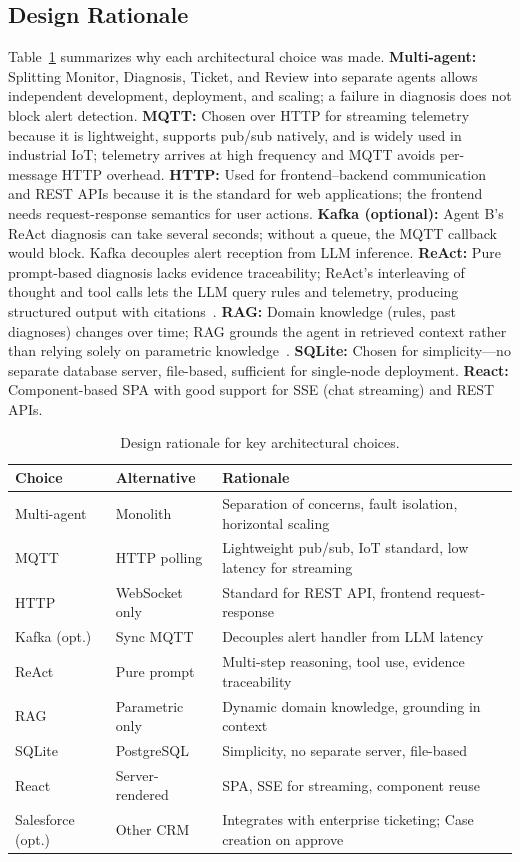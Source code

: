 \documentclass[12pt,letterpaper]{report}
\begin{document}
\subsection{Design Rationale}

Table~\ref{tab:rationale} summarizes why each architectural choice was made. \textbf{Multi-agent:} Splitting Monitor, Diagnosis, Ticket, and Review into separate agents allows independent development, deployment, and scaling; a failure in diagnosis does not block alert detection. \textbf{MQTT:} Chosen over HTTP for streaming telemetry because it is lightweight, supports pub/sub natively, and is widely used in industrial IoT; telemetry arrives at high frequency and MQTT avoids per-message HTTP overhead. \textbf{HTTP:} Used for frontend--backend communication and REST APIs because it is the standard for web applications; the frontend needs request-response semantics for user actions. \textbf{Kafka (optional):} Agent B's ReAct diagnosis can take several seconds; without a queue, the MQTT callback would block. Kafka decouples alert reception from LLM inference. \textbf{ReAct:} Pure prompt-based diagnosis lacks evidence traceability; ReAct's interleaving of thought and tool calls lets the LLM query rules and telemetry, producing structured output with citations~\cite{yao2023react}. \textbf{RAG:} Domain knowledge (rules, past diagnoses) changes over time; RAG grounds the agent in retrieved context rather than relying solely on parametric knowledge~\cite{lewis2020rag}. \textbf{SQLite:} Chosen for simplicity---no separate database server, file-based, sufficient for single-node deployment. \textbf{React:} Component-based SPA with good support for SSE (chat streaming) and REST APIs.

\begin{table}[htbp]
\centering
\caption{Design rationale for key architectural choices.}
\label{tab:rationale}
\small
\begin{tabular}{llp{5.2cm}}
\toprule
\textbf{Choice} & \textbf{Alternative} & \textbf{Rationale} \\
\midrule
Multi-agent & Monolith & Separation of concerns, fault isolation, horizontal scaling \\
MQTT & HTTP polling & Lightweight pub/sub, IoT standard, low latency for streaming \\
HTTP & WebSocket only & Standard for REST API, frontend request-response \\
Kafka (opt.) & Sync MQTT & Decouples alert handler from LLM latency \\
ReAct & Pure prompt & Multi-step reasoning, tool use, evidence traceability \\
RAG & Parametric only & Dynamic domain knowledge, grounding in context \\
SQLite & PostgreSQL & Simplicity, no separate server, file-based \\
React & Server-rendered & SPA, SSE for streaming, component reuse \\
Salesforce (opt.) & Other CRM & Integrates with enterprise ticketing; Case creation on approve \\
\bottomrule
\end{tabular}
\end{table}
\end{document}
